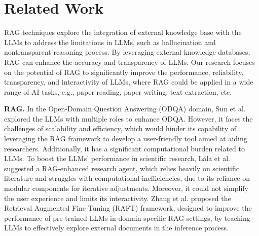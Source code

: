 \section{Related Work}
RAG \cite{gao2023retrieval} techniques explore the integration of external knowledge base with the LLMs to address the limitations in LLMs, such as hallucination and nontransparent reasoning process. By leveraging external knowledge databases, RAG can enhance the accuracy and transparency of LLMs. Our research focuses on the potential of RAG to significantly improve the performance, reliability, transparency, and interactivity of LLMs, where RAG could be applied in a wide range of AI tasks, e.g., paper reading, paper writing, text extraction, etc.

\textbf{RAG.} In the Open-Domain Question Answering (ODQA) domain, Sun et al. \cite{sun2024harnessing} explored the LLMs with multiple roles to enhance ODQA. However, it faces the challenges of scalability and efficiency, which would hinder its capability of leveraging the RAG framework to develop a user-friendly tool aimed at aiding researchers. Additionally, it has a significant computational burden related to LLMs. To boost the LLMs' performance in scientific research, L\'ala et al. \cite{lala2023paperqa} suggested a RAG-enhanced research agent, which relies heavily on scientific literature and struggles with computational inefficiencies, due to its reliance on modular components for iterative adjustments. Moreover, it could not simplify the user experience and limits its interactivity. Zhang et al. \cite{zhang2024raft} proposed the Retrieval Augmented Fine-Tuning (RAFT) framework, designed to improve the performance of pre-trained LLMs in domain-specific RAG settings, by teaching LLMs to effectively explore external documents in the inference process.

